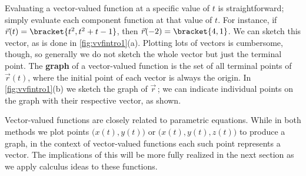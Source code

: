 Evaluating a vector-valued function at a specific value of $t$ is straightforward; simply evaluate each component function at that value of $t$. For instance, if $\vec r(t) =\bracket{t^2,t^2+t-1}$, then $\vec r(-2) =\bracket{4,1}$. We can sketch this vector, as is done in \autoref{fig:vvfintro1}(a). Plotting lots of vectors is cumbersome, though, so generally we do not sketch the whole vector but just the terminal point. The \textbf{graph} of a vector-valued function is the set of all terminal points of $\vec r(t)$, where the initial point of each vector is always the origin. In \autoref{fig:vvfintro1}(b) we sketch the graph of $\vec r$\,; we can indicate individual points on the graph with their respective vector, as shown.

Vector-valued functions are closely related to parametric equations. While in both methods we plot points $\bigl(x(t), y(t)\bigr)$ or $\bigl(x(t),y(t),z(t)\bigr)$ to produce a graph, in the context of vector-valued functions each such point represents a vector. The implications of this will be more fully realized in the next section as we apply calculus ideas to these functions.



